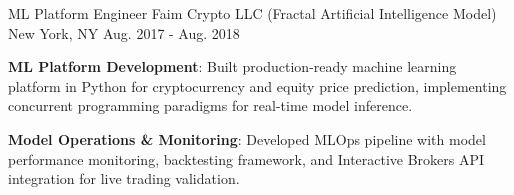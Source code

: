 \begin{cventries}
   \cventry 
        {ML Platform Engineer}
        {Faim Crypto LLC (Fractal Artificial Intelligence Model)}
        {New York, NY}
        {Aug. 2017 - Aug. 2018}
        {
          \begin{cvitems}
              \item{\textbf{ML Platform Development}: Built production-ready machine learning platform in Python for cryptocurrency and equity price prediction, implementing concurrent programming paradigms for real-time model inference.
              }
              \item{\textbf{Model Operations \& Monitoring}: Developed MLOps pipeline with model performance monitoring, backtesting framework, and Interactive Brokers API integration for live trading validation.
              }
          \end{cvitems}
        }
\end{cventries}
